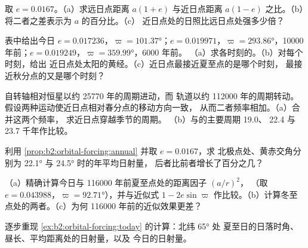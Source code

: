 \begin{exercise}[$\star$]\label{exo:b2:orbital-forcing:1}
取 $e = 0.0167$。（a）求远日点距离 $a(1 + e)$ 与近日点距离
$a(1 - e)$ 之比。（b）将二者之差表示为 $a$ 的百分比。（c）
近日点处的日照比远日点处强多少倍？
\end{exercise}

\begin{exercise}[$\star$]\label{exo:b2:orbital-forcing:2}
表中给出今日 $e = 0.017236$，$\varpi = \ang{101.37}$；$e = 0.019971$，$\varpi =
\ang{293.86}$，\num{10000} 年前；$e = 0.019249$，$\varpi = \ang{359.99}$，\num{6000} 年前。
（a）求各时刻的。（b）对每个时刻，给出
近日点处太阳的黄经。（c）近日点最接近夏至点的是哪个时刻，
最接近秋分点的又是哪个时刻？
\end{exercise}

\begin{exercise}[$\star$]\label{exo:b2:orbital-forcing:3}
自转轴相对恒星以约 \num{25770} 年的周期进动，而
轨道以约 \num{112000} 年的周期转动。假设两种运动使近日点相对春分点的移动方向一致，
从而二者频率相加。（a）合并这两个频率，
求近日点穿越季节的周期。
（b）与的主要周期 \num{19.0}、
\num{22.4} 与 \num{23.7} 千年作比较。
\end{exercise}

\begin{exercise}[$\star$]\label{exo:b2:orbital-forcing:4}
利用 \cref{prop:b2:orbital-forcing:annual} 并取 $e = 0.0167$，求
北极点处、黄赤交角分别为 \ang{22.1} 与 \ang{24.5} 时的年平均日射量，
后者比前者增长了百分之几？
\end{exercise}

\begin{exercise}[$\star\star$]\label{exo:b2:orbital-forcing:5}
（a）精确计算今日与 \num{116000} 年前夏至点处的距离因子 $(a/r)^2$，
（取 $e = 0.043988$，$\varpi = \ang{92.71}$），并与近似式 $1 -
2e\sin\varpi$ 作比较。（b）计算冬至点处的两者。（c）为何 \num{116000}
年前的近似效果更差？
\end{exercise}

\begin{exercise}[$\star\star$]\label{exo:b2:orbital-forcing:6}
逐步重现 \cref{ex:b2:orbital-forcing:today} 的计算：北纬 \ang{65} 处
夏至日的日落时角、昼长、平均距离处的日射量，以及
今日的日射量。
\end{exercise}

